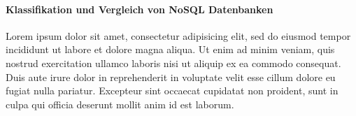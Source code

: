 \paragraph{Klassifikation und Vergleich von NoSQL Datenbanken}
Lorem ipsum dolor sit amet, consectetur adipisicing elit, sed do eiusmod
tempor incididunt ut labore et dolore magna aliqua. Ut enim ad minim veniam,
quis nostrud exercitation ullamco laboris nisi ut aliquip ex ea commodo
consequat. Duis aute irure dolor in reprehenderit in voluptate velit esse
cillum dolore eu fugiat nulla pariatur. Excepteur sint occaecat cupidatat non
proident, sunt in culpa qui officia deserunt mollit anim id est laborum. \nextline

\clearpage %